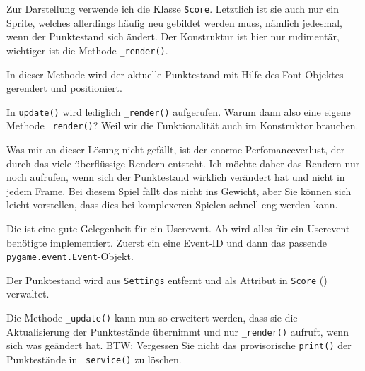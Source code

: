 Zur Darstellung verwende ich die Klasse \texttt{Score}. Letztlich ist sie auch nur ein Sprite, welches allerdings häufig neu gebildet werden muss, nämlich jedesmal, wenn der Punktestand sich ändert. Der Konstruktur ist hier nur rudimentär, wichtiger ist die Methode \texttt{\_render()}.


In dieser Methode wird der aktuelle Punktestand mit Hilfe des Font-Objektes gerendert und positioniert.


In \texttt{update()} wird lediglich \texttt{\_render()} aufgerufen. Warum dann also eine eigene Methode \texttt{\_render()}? Weil wir die Funktionalität auch im Konstruktor brauchen.


Was mir an dieser Lösung nicht gefällt, ist der enorme Perfomanceverlust, der durch das viele überflüssige Rendern entsteht. Ich möchte daher das Rendern nur noch aufrufen, wenn sich der Punktestand wirklich verändert hat und nicht in jedem Frame. Bei diesem Spiel fällt das nicht ins Gewicht, aber Sie können sich leicht vorstellen, dass dies bei komplexeren Spielen schnell eng werden kann.

Die ist eine gute Gelegenheit für ein Userevent. Ab  wird alles für ein Userevent benötigte implementiert. Zuerst ein eine Event-ID und dann das passende \texttt{pygame.e\-vent\-.E\-vent}-Objekt.


Der Punktestand wird aus \texttt{Settings} entfernt und als Attribut in \texttt{Score} () verwaltet.


Die Methode \texttt{\_update()} kann nun so erweitert werden, dass sie die Aktualisierung der Punktestände übernimmt und nur \texttt{\_render()} aufruft, wenn sich was geändert hat. BTW: Vergessen Sie nicht das provisorische \texttt{print()} der Punktestände in \texttt{\_service()} zu löschen.

